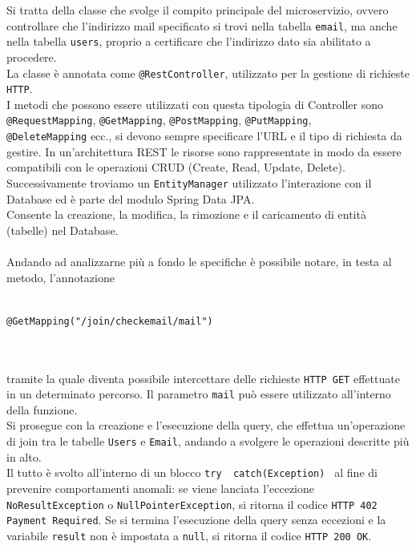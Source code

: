 Si tratta della classe che svolge il compito principale del microservizio, ovvero controllare che l'indirizzo mail specificato si trovi nella 
tabella \texttt{email}, ma anche nella tabella \texttt{users}, proprio a certificare che l'indirizzo dato sia abilitato a procedere.\\
La classe è annotata come \texttt{@RestController}, utilizzato per la gestione di richieste \texttt{HTTP}.\\
I metodi che possono essere utilizzati con questa tipologia di Controller sono \texttt{@RequestMapping}, \texttt{@GetMapping}, 
\texttt{@PostMapping}, \texttt{@PutMapping},\\ \texttt{@DeleteMapping} ecc., si devono sempre specificare l'URL e il tipo di richiesta da gestire.
In un'architettura REST le risorse sono rappresentate in modo da essere compatibili con le operazioni CRUD (Create, Read, Update, Delete).\\
Successivamente troviamo un \texttt{EntityManager} utilizzato l'interazione con il Database ed è parte del modulo Spring Data JPA.\\
Consente la creazione, la modifica, la rimozione e il caricamento di entità (tabelle) nel Database. \\ \\
Andando ad analizzarne più a fondo le specifiche è possibile notare, in testa al metodo, l'annotazione\\ \\
\centerline{\texttt{@GetMapping("/join/checkemail/{mail}")}} \\ \\
tramite la quale diventa possibile intercettare delle richieste \texttt{HTTP GET} effettuate in un determinato percorso. Il parametro \texttt{{mail}} può essere
utilizzato all'interno della funzione.\\
Si prosegue con la creazione e l'esecuzione della query, che effettua un'operazione di join tra le tabelle \texttt{Users} e \texttt{Email}, andando a 
svolgere le operazioni descritte più in alto.\\
Il tutto è svolto all'interno di un blocco \texttt{try{ } catch(Exception){ }} al fine di prevenire comportamenti anomali: se viene lanciata l'eccezione\\
\texttt{NoResultException} o \texttt{NullPointerException}, si ritorna il codice \texttt{HTTP 402 Payment Required}.
Se si termina l'esecuzione della query senza eccezioni e la variabile \texttt{result} non è impostata a \texttt{null}, si ritorna il codice \texttt{HTTP 200 OK}.

